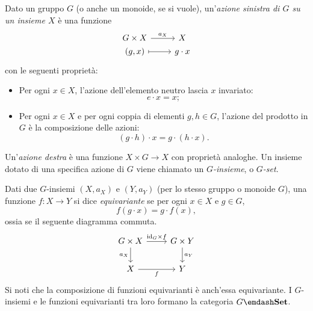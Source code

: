 \begin{example}\label{ex_cat_g_insiemi}
	Dato un gruppo \(G\) (o anche un monoide, se si vuole), un'\emph{azione sinistra di \(G\) su un insieme \(X\)} è una funzione
	\[
		\begin{tikzcd}[row sep=0]
			G\times X \ar{r}{a_X} & X \\
			(g,x) \ar[mapsto]{r} & g\cdot x
		\end{tikzcd}
	\]
	con le seguenti proprietà:
	\begin{itemize}
		\item Per ogni \(x\in X\), l'azione dell'elemento neutro lascia \(x\) invariato:
		      \[
			      e\cdot x = x ;
		      \]
		\item Per ogni \(x\in X\) e per ogni coppia di elementi \(g,h\in G\), l'azione del prodotto in \(G\) è la composizione delle azioni:
		      \[
			      (g\cdot h)\cdot x = g\cdot(h\cdot x) .
		      \]
	\end{itemize}
	Un'\emph{azione destra} è una funzione \(X\times G\to X\) con proprietà analoghe.
	Un insieme dotato di una specifica azione di \(G\) viene chiamato un \emph{\(G\)-insieme}, o \emph{\(G\)-set}.

	Dati due \(G\)-insiemi \((X,a_X)\) e \((Y,a_Y)\) (per lo stesso gruppo o monoide \(G\)), una funzione \(f:X\to Y\) si dice \emph{equivariante} se per ogni \(x\in X\) e \(g\in G\),
	\[
		f(g\cdot x) = g\cdot f(x) ,
	\]
	ossia se il seguente diagramma commuta.
	\[
		\begin{tikzcd}
			G\times X \ar{r}{\id_G\times f} \ar[d, "a_X"'] & G\times Y \ar{d}{a_Y} \\
			X \ar[r, "f"'] & Y
		\end{tikzcd}
	\]
	Si noti che la composizione di funzioni equivarianti è anch'essa equivariante. I \(G\)-insiemi e le funzioni equivarianti tra loro formano la categoria \(G\emdash\ctSet\).
\end{example}
